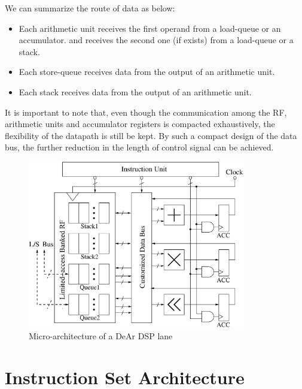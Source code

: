         We can summarize the route of data as below:
        \begin{itemize}
            \item Each arithmetic unit receives the first operand from a load-queue or an accumulator.
        and receives the second one (if exists) from a load-queue or a stack.
            \item Each store-queue receives data from the output of an arithmetic unit.
            \item Each stack receives data from the output of an arithmetic unit.
        \end{itemize}
        It is important to note that, even though the communication among the RF, arithmetic units and accumulator registers is compacted exhaustively, 
        the flexibility of the datapath is still be kept.
        By such a compact design of the data bus, the further reduction in the length of control signal can be achieved.
        \vspace{\textfig}
        \begin{figure}[!ht] 
            \centering
            \includegraphics[width=0.85\textwidth]{./figs/micro.eps}
            \caption{Micro-architecture of a DeAr DSP lane}
            \label{fig:micro}
        \end{figure}

    \section{Instruction Set Architecture}

